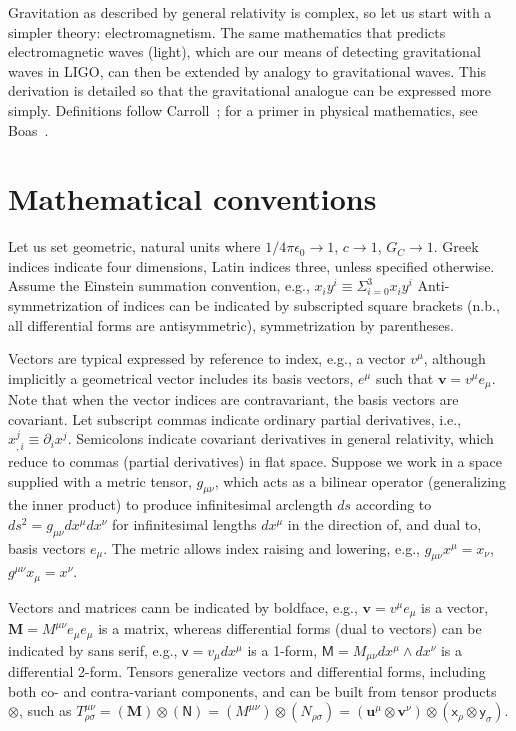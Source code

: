 \label{field_curvature_math}
    
    Gravitation as described by general relativity is complex, so let us start with a simpler theory: electromagnetism. 
The same mathematics that predicts electromagnetic waves (light), which are our means of detecting gravitational waves in LIGO, can then be extended by analogy to gravitational waves.
This derivation is detailed so that the gravitational analogue can be expressed more simply.
Definitions follow Carroll~\cite{Carroll1997}; for a primer in physical mathematics, see Boas~\cite{Boas}.

\section{Mathematical conventions}

    Let us set geometric, natural units where $1/4\pi\epsilon_0 \rightarrow 1$, $c \rightarrow 1$, $G_C \rightarrow 1$. 
Greek indices indicate four dimensions, Latin indices three, unless specified otherwise.
Assume the Einstein summation convention, e.g., $x_i y^i \equiv \Sigma_{i=0}^3 x_i y^i$
Anti-symmetrization of indices can be indicated by subscripted square brackets (n.b., all differential forms are antisymmetric), symmetrization by parentheses.

Vectors are typical expressed by reference to index, e.g., a vector $v^\mu$, although implicitly a geometrical vector includes its basis vectors, $e^\mu$ such that $\textbf{v} = v^\mu e_\mu$.
Note that when the vector indices are contravariant, the basis vectors are covariant.
Let subscript commas indicate ordinary partial derivatives, i.e., $x_{,i}^j \equiv \partial_i x^j$.
Semicolons indicate covariant derivatives in general relativity, which reduce to commas (partial derivatives) in flat space. 
Suppose we work in a space supplied with a metric tensor, $g_{\mu\nu}$, which acts as a bilinear operator (generalizing the inner product) to produce infinitesimal arclength $ds$ according to $ds^2 = g_{\mu \nu} dx^\mu dx^\nu$ for infinitesimal lengths $dx^\mu$ in the direction of, and dual to, basis vectors $e_\mu$. 
The metric allows index raising and lowering, e.g., $g_{\mu \nu} x^\mu = x_\nu$, $g^{\mu \nu} x_\mu = x^\nu$.

Vectors and matrices cann be indicated by boldface, e.g., $\textbf{v} = v^\mu e_\mu$ is a vector, $\textbf{M} = M^{\mu\nu} e_\mu e_\mu $ is a matrix, whereas differential forms (dual to vectors) can be indicated by sans serif, e.g., $\textsf{v} = v_\mu dx^\mu$ is a 1-form, $\textsf{M} = M_{\mu\nu} dx^\mu \wedge dx^\nu$ is a differential 2-form.
Tensors generalize vectors and differential forms, including both co- and contra-variant components, and can be built from tensor products $\otimes$, such as $T^{\mu\nu}_{\rho\sigma} = (\textbf{M})\otimes (\textsf{N}) = (M^{\mu\nu}) \otimes (N_{\rho\sigma})= (\textbf{u}^\mu \otimes \textbf{v}^\nu) \otimes (\textsf{x}_\rho \otimes \textsf{y}_\sigma)$.

